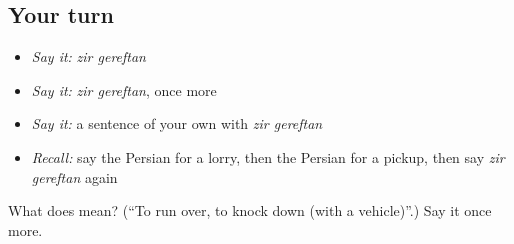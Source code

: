 \subsection*{Your turn}
\begin{itemize}
\raggedright
  \item \emph{Say it:} \emph{zir gereftan}
  \item \emph{Say it:} \emph{zir gereftan}, once more
  \item \emph{Say it:} a sentence of your own with \emph{zir gereftan}
  \item \emph{Recall:} say the Persian for a lorry, then the Persian for a pickup, then say \emph{zir gereftan} again
\end{itemize}

\begin{tcolorbox}[breakable,colback=teal!4,colframe=teal!35!black,title={Before you move on}]
What does   mean? (\textquotedblleft{}To run over, to knock down (with a vehicle)\textquotedblright{}.) Say it once more.
\end{tcolorbox}
